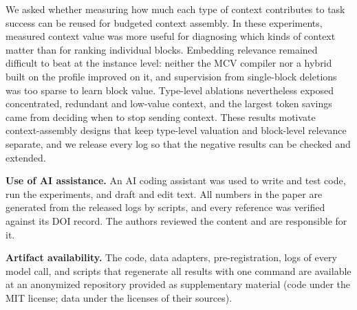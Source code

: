 We asked whether measuring how much each type of context contributes to task success can be reused for budgeted
context assembly. In these experiments, measured context value was more useful for diagnosing which kinds of context
matter than for ranking individual blocks. Embedding relevance remained difficult to beat at the instance level: neither
the MCV compiler nor a hybrid built on the profile improved on it, and supervision from single-block deletions was too
sparse to learn block value. Type-level ablations nevertheless exposed concentrated, redundant and low-value context,
and the largest token savings came from deciding when to stop sending context. These results motivate context-assembly
designs that keep type-level valuation and block-level relevance separate, and we release every log so that the
negative results can be checked and extended.

\textbf{Use of AI assistance.} An AI coding assistant was used to write and test code, run the experiments, and draft
and edit text. All numbers in the paper are generated from the released logs by scripts, and every reference was
verified against its DOI record. The authors reviewed the content and are responsible for it.

\textbf{Artifact availability.} The code, data adapters, pre-registration, logs of every model call, and scripts that
regenerate all results with one command are available at
an anonymized repository provided as supplementary material (code under the MIT license; data under the licenses of
their sources).
